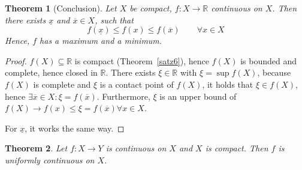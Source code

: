 \documentclass{article}
\newtheorem{theorem}{Theorem}  \numberwithin{theorem}{section}
\begin{document}
\begin{theorem}[Conclusion] %
  \label{satz7}
  Let $X$ be compact, $f: X \to \mathbb R$ continuous on $X$.
  Then there exists $\underline{x}$ and $\overline{x} \in X$, such that
  \[ f(\underline{x}) \leq f(x) \leq f(\overline{x}) \qquad \forall x \in X \]
  Hence, $f$ has a maximum and a minimum.
\end{theorem}

\begin{proof}
  $f(X) \subseteq \mathbb R$ is compact (Theorem~\ref{satz6}), hence $f(X)$ is bounded and complete, hence closed in $\mathbb R$.
  There exists $\xi \in \mathbb R$ with $\xi = \sup{f(X)}$, because $f(X)$ is complete and $\xi$ is a contact point of $f(X)$, it holds that $\xi \in f(X)$, hence $\exists \overline{x} \in X: \xi = f(\overline{x})$. Furthermore, $\xi$ is an upper bound of $f(X) \to f(x) \leq \xi = f(\overline{x}) \forall x \in X$.

  For $\underline{x}$, it works the same way.
\end{proof}

\begin{theorem} %
  \label{satz8}
  Let $f: X \to Y$ is continuous on $X$ and $X$ is compact. Then $f$ is uniformly continuous on $X$.
\end{theorem}
\end{document}
